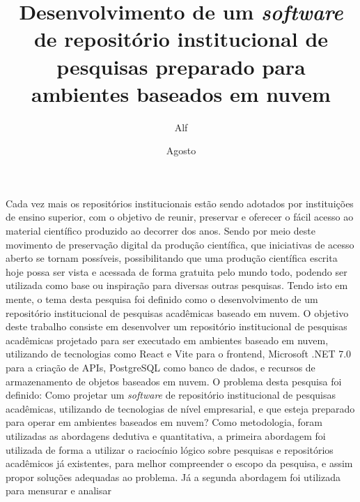 \documentclass[diss]{template/setrem}
\title{Desenvolvimento de um \emph{software} de repositório institucional de pesquisas preparado para ambientes baseados em nuvem}
\author{Alf}{Lucas Machado}
\date{Agosto}{2022}
\begin{document}
\maketitle
% 



\begin{resumo}
    \noindent

    Cada vez mais os repositórios institucionais estão sendo adotados por instituições de
    ensino superior, com o objetivo de reunir, preservar e oferecer o fácil acesso ao material
    científico produzido ao decorrer dos anos. Sendo por meio deste movimento de preservação
    digital da produção científica, que iniciativas de acesso aberto se tornam possíveis,
    possibilitando que uma produção científica escrita hoje possa ser vista e acessada
    de forma gratuita pelo mundo todo, podendo ser utilizada como base ou inspiração para
    diversas outras pesquisas. Tendo isto em mente, o tema desta pesquisa foi definido como
    o desenvolvimento de um repositório institucional de pesquisas acadêmicas baseado em nuvem.
    O objetivo deste trabalho consiste em desenvolver um repositório institucional
    de pesquisas acadêmicas projetado para ser executado em ambientes baseado em
    nuvem, utilizando de tecnologias como React e Vite para o frontend, Microsoft
    .NET 7.0 para a criação de APIs, PostgreSQL como banco de dados, e recursos de
    armazenamento de objetos baseados em nuvem.
    O problema desta pesquisa foi definido:
    Como projetar um \emph{software} de repositório institucional de pesquisas
    acadêmicas, utilizando de tecnologias de nível empresarial, e que esteja
    preparado para operar em ambientes baseados em nuvem?
    Como metodologia, foram utilizadas
    as abordagens dedutiva e quantitativa, a primeira abordagem foi utilizada de
    forma a utilizar o raciocínio lógico sobre pesquisas e repositórios acadêmicos
    já existentes, para melhor compreender o escopo da pesquisa, e assim propor soluções
    adequadas ao problema. Já a segunda abordagem foi utilizada para mensurar e analisar

\end{resumo}
\end{document}
